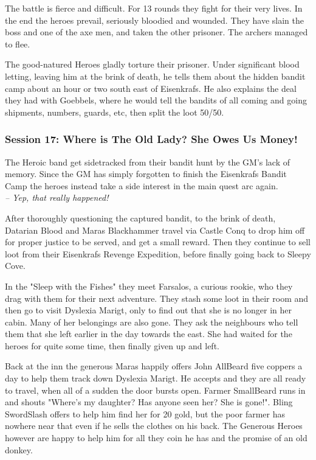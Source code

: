 The battle is fierce and difficult. For 13 rounds they fight for their very lives. In the end the heroes prevail, seriously bloodied and wounded. They have slain the boss and one of the axe men, and taken the other prisoner. The archers managed to flee.

The good-natured Heroes gladly torture their prisoner. Under significant blood letting, leaving him at the brink of death, he tells them about the hidden bandit camp about an hour or two south east of Eisenkrafs. He also explains the deal they had with Goebbels, where he would tell the bandits of all coming and going shipments, numbers, guards, etc, then split the loot 50/50.


\subsubsection*{Session 17: Where is The Old Lady? She Owes Us Money!}
\begin{readoutloud}
The Heroic band get sidetracked from their bandit hunt by the GM's lack of memory. Since the GM has simply forgotten to finish the Eisenkrafs Bandit Camp the heroes instead take a side interest in the main quest arc again.\\
\emph{-- Yep, that really happened!}
\end{readoutloud}

After thoroughly questioning the captured bandit, to the brink of death, Datarian Blood and Maras Blackhammer travel via Castle Conq to drop him off for proper justice to be served, and get a small reward. Then they continue to sell loot from their Eisenkrafs Revenge Expedition, before finally going back to Sleepy Cove.

In the "Sleep with the Fishes" they meet Farsalos, a curious rookie, who they drag with them for their next adventure. They stash some loot in their room and then go to visit Dyslexia Marigt, only to find out that she is no longer in her cabin. Many of her belongings are also gone. They ask the neighbours who tell them that she left earlier in the day towards the east. She had waited for the heroes for quite some time, then finally given up and left.

Back at the inn the generous Maras happily offers John AllBeard five coppers a day to help them track down Dyslexia Marigt. He accepts and they are all ready to travel, when all of a sudden the door bursts open. Farmer SmallBeard runs in and shouts "Where's my daughter? Has anyone seen her? She is gone!". Bling SwordSlash offers to help him find her for 20 gold, but the poor farmer has nowhere near that even if he sells the clothes on his back. The Generous Heroes however are happy to help him for all they coin he has and the promise of an old donkey.

